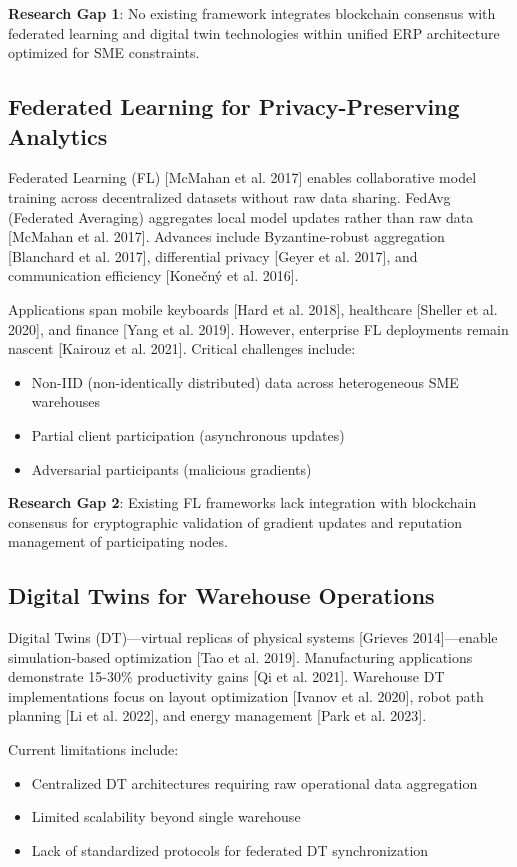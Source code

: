 \documentclass[times,10pt,twocolumn]{jucs2e}
\begin{document}
\textbf{Research Gap 1}: No existing framework integrates blockchain consensus with federated learning and digital twin technologies within unified ERP architecture optimized for SME constraints.

\subsection{Federated Learning for Privacy-Preserving Analytics}

Federated Learning (FL) [McMahan et al. 2017] enables collaborative model training across decentralized datasets without raw data sharing. FedAvg (Federated Averaging) aggregates local model updates rather than raw data [McMahan et al. 2017]. Advances include Byzantine-robust aggregation [Blanchard et al. 2017], differential privacy [Geyer et al. 2017], and communication efficiency [Konečný et al. 2016].

Applications span mobile keyboards [Hard et al. 2018], healthcare [Sheller et al. 2020], and finance [Yang et al. 2019]. However, enterprise FL deployments remain nascent [Kairouz et al. 2021]. Critical challenges include:
\begin{itemize}
\item Non-IID (non-identically distributed) data across heterogeneous SME warehouses
\item Partial client participation (asynchronous updates)
\item Adversarial participants (malicious gradients)
\end{itemize}

\textbf{Research Gap 2}: Existing FL frameworks lack integration with blockchain consensus for cryptographic validation of gradient updates and reputation management of participating nodes.

\subsection{Digital Twins for Warehouse Operations}

Digital Twins (DT)—virtual replicas of physical systems [Grieves 2014]—enable simulation-based optimization [Tao et al. 2019]. Manufacturing applications demonstrate 15-30\% productivity gains [Qi et al. 2021]. Warehouse DT implementations focus on layout optimization [Ivanov et al. 2020], robot path planning [Li et al. 2022], and energy management [Park et al. 2023].

Current limitations include:
\begin{itemize}
\item Centralized DT architectures requiring raw operational data aggregation
\item Limited scalability beyond single warehouse
\item Lack of standardized protocols for federated DT synchronization
\end{itemize}
\end{document}
